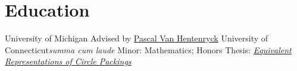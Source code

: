 \section{Education}
		{University of Michigan}{}{}
		{Advised by \href{http://pascalvanhentenryck.engin.umich.edu/}{Pascal Van Hentenryck}}
		{University of Connecticut}{}{\textit{summa cum laude}}
		{Minor: Mathematics; Honors Thesis: \href{}{\textit{Equivalent Representations of Circle Packings}}}
